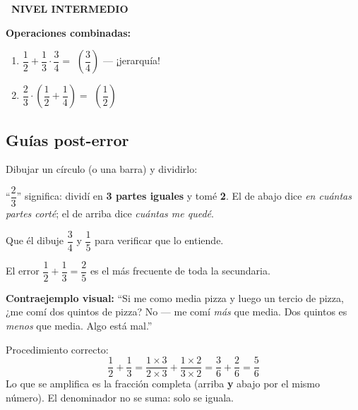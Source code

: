 \documentclass[11pt,a4paper]{article}
\newcommand{\nivelintermedio}{%
  \par\smallskip\colorbox{naranja}{\color{white}\small\bfseries\ NIVEL INTERMEDIO\ }\par\smallskip}
\begin{document}
\nivelintermedio

\textbf{Operaciones combinadas:}
\begin{enumerate}[label=\textbf{\arabic*.},leftmargin=1cm,itemsep=6pt,start=10]
  \item $\dfrac{1}{2} + \dfrac{1}{3} \cdot \dfrac{3}{4} = $ \hfill \textit{$\left(\dfrac{3}{4}\right)$} {\small --- ¡jerarquía!}
  \item $\dfrac{2}{3} \cdot \left(\dfrac{1}{2} + \dfrac{1}{4}\right) = $ \hfill \textit{$\left(\dfrac{1}{2}\right)$}
\end{enumerate}

\subsection{Guías post-error}

\begin{tcolorbox}[guia-tutor, title={\color{tutormorado} SI NO ``VE'' QUÉ ES UNA FRACCIÓN}]
Dibujar un círculo (o una barra) y dividirlo:

\begin{center}
\end{center}

``$\dfrac{2}{3}$'' significa: dividí en \textbf{3 partes iguales} y tomé \textbf{2}. El de abajo dice \emph{en cuántas partes corté}; el de arriba dice \emph{cuántas me quedé}.

Que él dibuje $\dfrac{3}{4}$ y $\dfrac{1}{5}$ para verificar que lo entiende.
\end{tcolorbox}

\begin{tcolorbox}[guia-tutor, title={\color{tutormorado} SI SUMA NUMERADORES \emph{Y} DENOMINADORES}]
El error $\dfrac{1}{2} + \dfrac{1}{3} = \dfrac{2}{5}$ es el más frecuente de toda la secundaria.

\textbf{Contraejemplo visual:} ``Si me como media pizza y luego un tercio de pizza, ¿me comí dos quintos de pizza? No --- me comí \emph{más} que media. Dos quintos es \emph{menos} que media. Algo está mal.''

Procedimiento correcto:
\[
  \frac{1}{2} + \frac{1}{3} = \frac{1 \times 3}{2 \times 3} + \frac{1 \times 2}{3 \times 2} = \frac{3}{6} + \frac{2}{6} = \frac{5}{6}
\]
Lo que se amplifica es la fracción completa (arriba \textbf{y} abajo por el mismo número). El denominador no se suma: solo se iguala.
\end{tcolorbox}
\end{document}
